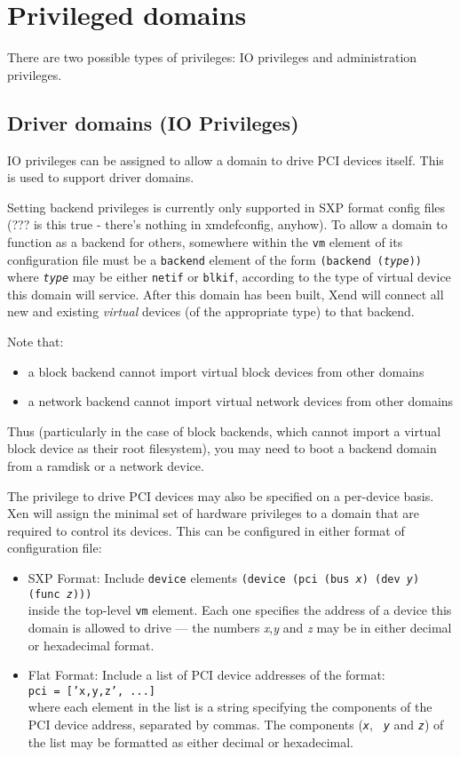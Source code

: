 \documentclass[11pt,twoside,final,openright]{xenstyle}
\begin{document}
{\chapter{Privileged domains}

There are two possible types of privileges:  IO privileges and
administration privileges.

\section{Driver domains (IO Privileges)}

IO privileges can be assigned to allow a domain to drive PCI devices
itself.  This is used to support driver domains.

Setting backend privileges is currently only supported in SXP format
config files (??? is this true - there's nothing in xmdefconfig,
anyhow).  To allow a domain to function as a backend for others,
somewhere within the {\tt vm} element of its configuration file must
be a {\tt backend} element of the form {\tt (backend ({\em type}))}
where {\tt \em type} may be either {\tt netif} or {\tt blkif},
according to the type of virtual device this domain will service.
After this domain has been built, Xend will connect all new and
existing {\em virtual} devices (of the appropriate type) to that
backend.

Note that:
\begin{itemize}
\item a block backend cannot import virtual block devices from other
domains
\item a network backend cannot import virtual network devices from
other domains
\end{itemize}

Thus (particularly in the case of block backends, which cannot import
a virtual block device as their root filesystem), you may need to boot
a backend domain from a ramdisk or a network device.

The privilege to drive PCI devices may also be specified on a
per-device basis.  Xen will assign the minimal set of hardware
privileges to a domain that are required to control its devices.  This
can be configured in either format of configuration file:

\begin{itemize}
\item SXP Format:
  Include {\tt device} elements
  {\tt (device (pci (bus {\em x}) (dev {\em y}) (func {\em z}))) } \\
  inside the top-level {\tt vm} element.  Each one specifies the address
  of a device this domain is allowed to drive ---
  the numbers {\em x},{\em y} and {\em z} may be in either decimal or
  hexadecimal format.
\item Flat Format: Include a list of PCI device addresses of the
  format: \\ {\tt pci = ['x,y,z', ...] } \\ where each element in the
  list is a string specifying the components of the PCI device
  address, separated by commas.  The components ({\tt \em x}, {\tt \em
  y} and {\tt \em z}) of the list may be formatted as either decimal
  or hexadecimal.
\end{itemize}

}
\end{document}
